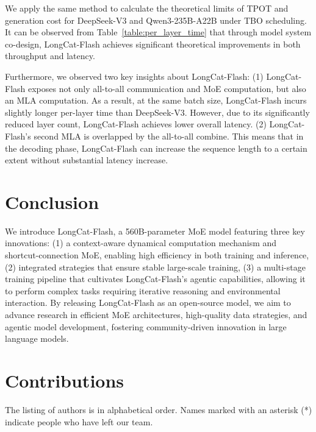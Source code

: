 \documentclass{article}
\newcommand{\longcat}{LongCat-Flash\xspace}
\begin{document}
We apply the same method to calculate the theoretical limits of TPOT and generation cost for DeepSeek-V3 and Qwen3-235B-A22B under TBO scheduling. It can be observed from Table~\ref{table:per_layer_time} that through model system co-design, \longcat achieves significant theoretical improvements in both throughput and latency.

Furthermore, we observed two key insights about \longcat: (1) \longcat exposes not only all-to-all communication and MoE computation, but also an MLA computation. As a result, at the same batch size, \longcat incurs slightly longer per-layer time than DeepSeek-V3. However, due to its significantly reduced layer count, \longcat achieves lower overall latency. (2) \longcat's second MLA is overlapped by the all-to-all combine. This means that in the decoding phase, \longcat can increase the sequence length to a certain extent without substantial latency increase.

\section{Conclusion}

We introduce \longcat, a 560B-parameter MoE model featuring three key innovations: (1) a context-aware dynamical computation mechanism and shortcut-connection MoE, enabling high efficiency in both training and inference, (2) integrated strategies that ensure stable large-scale training, (3) a multi-stage training pipeline that cultivates \longcat's agentic capabilities, allowing it to perform complex tasks requiring iterative reasoning and environmental interaction.
By releasing \longcat as an open-source model, we aim to advance research in efficient MoE architectures, high-quality data strategies, and agentic model development, fostering community-driven innovation in large language models.

\clearpage

\section{Contributions}

The listing of authors is in alphabetical order. Names marked with an asterisk (*) indicate people who have left our team.
\end{document}
